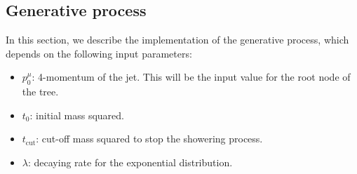 \documentclass[12pt]{article}
\begin{document}
\subsection{Generative process}

In this section, we describe the implementation of the generative process, which depends on the following input parameters:
\begin{itemize}

\item $p_0^\mu$: 4-momentum of the jet. This will be the input value for the root node of the tree.
\item $t_0$: initial mass squared. 
\item $t_\text{cut}$: cut-off mass squared to stop the showering process. 
\item $\lambda$: decaying rate for the exponential distribution.

\end{itemize}
\end{document}
